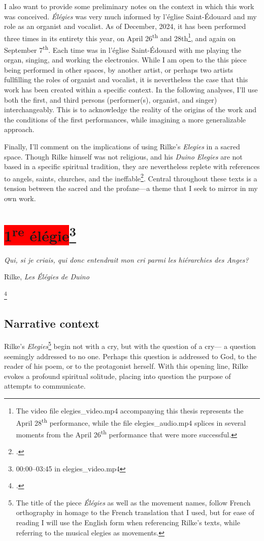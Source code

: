 \documentclass[12pt,twoside,maitrise]{dms_ks}
\theoremstyle{definition}
\begin{document}
{I also want to provide some preliminary notes on the context in which this work was conceived. 
\textit{Élégies} was very much informed by l'église Saint-Édouard and my role as an organist and vocalist. 
As of December, 2024, it has been performed three times in its entirety this year, on April 26\textsuperscript{th} and 28{th}\footnote{The video file elegies\_video.mp4 accompanying this thesis represents the April 28\textsuperscript{th} performance, while the file elegies\_audio.mp4 splices in several moments from the April 26\textsuperscript{th} performance that were more successful.}, and again on September 7\textsuperscript{th}.
Each time was in l'église Saint-Édouard with me playing the organ, singing, and working the electronics.
While I am open to the this piece being performed in other spaces, by another artist, or perhaps two artists fullfilling the roles of organist and vocalist, it is nevertheless the case that this work has been created within a specific context. 
In the following analyses, I'll use both the first, and third persons (performer(s), organist, and singer) interchangeably. 
This is to acknowledge the reality of the origins of the work and the conditions of the first performances, while imagining a more generalizable approach.  

Finally, I'll comment on the implications of using Rilke's \textit{Elegies} in a sacred space. 
Though Rilke himself was not religious, and his \textit{Duino Elegies} are not based in a specific spiritual tradition, they are nevertheless replete with references to angels, saints, churches, and the ineffable\footcite[147]{gass_reading_2013}.
Central throughout these texts is a tension between the sacred and the profane---a theme that I seek to mirror in my own work. 

\section{\colorbox{red}{1\textsuperscript{re} élégie}\footnote{00:00--03:45 in elegies\_video.mp4}}

\epigraph{\textit{Qui, si je criais, qui donc entendrait mon cri parmi les hiérarchies des Anges?}}{Rilke, \textit{Les Élégies de Duino}\protect\footnotemark}

\footcitetext[9]{rilke_egies_1986}

\subsection{Narrative context}
Rilke's \textit{Elegies}\footnote{The title of the piece \textit{Élégies} as well as the movement names, follow French orthography in homage to the French translation that I used, but for ease of reading I will use the English form when referencing Rilke's texts, while referring to the musical elegies as movements.} begin not with a cry, but with the question of a cry--- a question seemingly addressed to no one.
Perhaps this question is addressed to God, to the reader of his poem, or to the protagonist herself.
With this opening line, Rilke evokes a profound spiritual solitude, placing into question the purpose of attempts to communicate.

}
\end{document}
